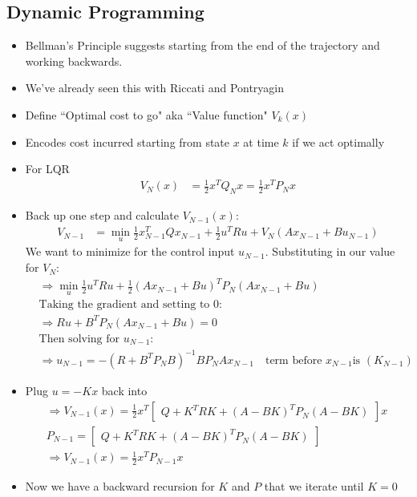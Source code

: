 \documentclass[11pt]{article}
\begin{document}
\subsection{Dynamic Programming}
\begin{itemize}
    \item Bellman's Principle suggests starting from the end of the trajectory and working backwards. 
    \item We've already seen this with Riccati and Pontryagin
    \item Define ``Optimal cost to go" aka ``Value function" $V_k(x)$
    \item Encodes cost incurred starting from state $x$ at time $k$ if we act optimally
    \item For LQR
    \begin{align*}
        V_N(x) &= \frac{1}{2}x^TQ_Nx = \frac{1}{2}x^TP_Nx
    \end{align*}
    \item Back up one step and calculate $V_{N-1}(x)$:
    \begin{align*}
        V_{N-1} &= \min_u \frac{1}{2}x_{N-1}^TQx_{N-1} + \frac{1}{2}u^TRu + V_N(Ax_{N-1}+Bu_{N-1})
    \end{align*}
    We want to minimize for the control input $u_{N-1}$. Substituting in our value for $V_N$:
    \begin{align*}
        &\Rightarrow \min_u \frac{1}{2}u^TRu+\frac{1}{2}(Ax_{N-1}+Bu)^TP_N(Ax_{N-1}+Bu)
        \\
        &\text{Taking the gradient and setting to 0:}
        \\
        &\Rightarrow Ru + B^TP_N(Ax_{N-1}+Bu) = 0
        \\
        &\text{Then solving for }u_{N-1}:
        \\
        &\Rightarrow u_{N-1} = -(R+B^TP_NB)^{-1}BP_NAx_{N-1}\quad \text{term before } x_{N-1} \text{is }(K_{N-1})
    \end{align*}
    \item Plug $u=-Kx$ back into 
    \begin{align*}
        &\Rightarrow V_{N-1}(x) = \frac{1}{2}x^T\begin{bmatrix}
            Q + K^TRK + (A-BK)^TP_N(A-BK)
        \end{bmatrix}x \quad 
        \\
        &P_{N-1} = \begin{bmatrix}
            Q + K^TRK + (A-BK)^TP_N(A-BK)
        \end{bmatrix}
        \\
        &\Rightarrow V_{N-1}(x) = \frac{1}{2}x^TP_{N-1}x
    \end{align*}
    \item Now we have a backward recursion for $K$ and $P$ that we iterate until $K=0$
\end{itemize}
\end{document}
